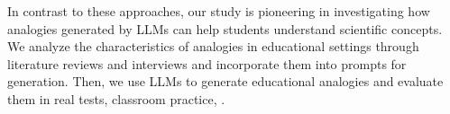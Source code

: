 
In contrast to these approaches, our study is pioneering in investigating how analogies generated by LLMs can help students understand scientific concepts. 
We analyze the characteristics of analogies in educational settings through literature reviews and interviews and incorporate them into prompts for generation. 
Then, we use LLMs to generate educational analogies and evaluate them in real tests, classroom practice, .

